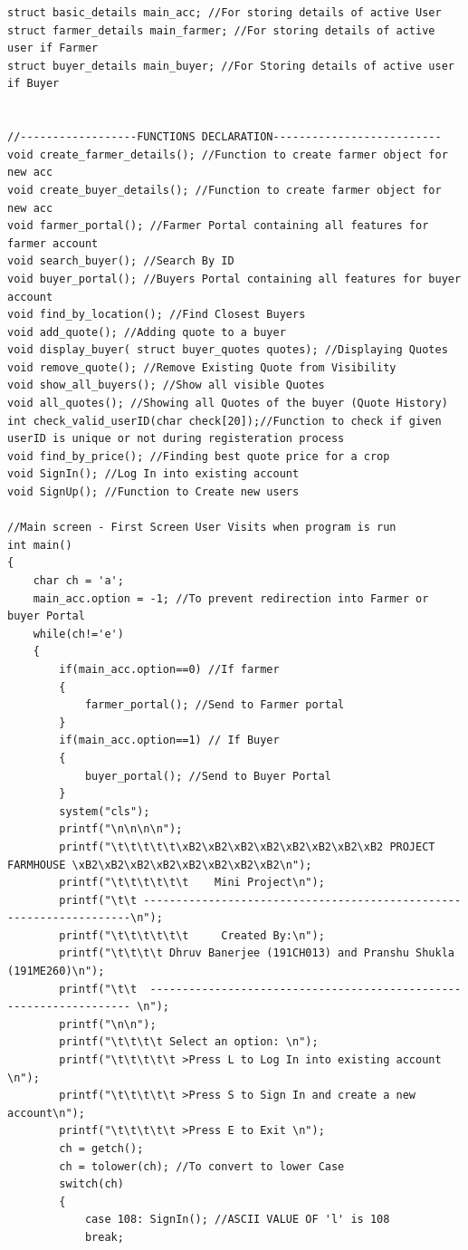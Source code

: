 \documentclass[12pt]{article}
\begin{document}
\begin{lstlisting}
struct basic_details main_acc; //For storing details of active User
struct farmer_details main_farmer; //For storing details of active user if Farmer
struct buyer_details main_buyer; //For Storing details of active user if Buyer


//------------------FUNCTIONS DECLARATION--------------------------
void create_farmer_details(); //Function to create farmer object for new acc
void create_buyer_details(); //Function to create farmer object for new acc
void farmer_portal(); //Farmer Portal containing all features for farmer account
void search_buyer(); //Search By ID
void buyer_portal(); //Buyers Portal containing all features for buyer account
void find_by_location(); //Find Closest Buyers
void add_quote(); //Adding quote to a buyer
void display_buyer( struct buyer_quotes quotes); //Displaying Quotes
void remove_quote(); //Remove Existing Quote from Visibility
void show_all_buyers(); //Show all visible Quotes
void all_quotes(); //Showing all Quotes of the buyer (Quote History)
int check_valid_userID(char check[20]);//Function to check if given userID is unique or not during registeration process
void find_by_price(); //Finding best quote price for a crop
void SignIn(); //Log In into existing account
void SignUp(); //Function to Create new users

//Main screen - First Screen User Visits when program is run
int main()
{
    char ch = 'a';
    main_acc.option = -1; //To prevent redirection into Farmer or buyer Portal
    while(ch!='e')
    {
        if(main_acc.option==0) //If farmer
        {
            farmer_portal(); //Send to Farmer portal
        }
        if(main_acc.option==1) // If Buyer
        {
            buyer_portal(); //Send to Buyer Portal
        }
        system("cls");
        printf("\n\n\n\n");
        printf("\t\t\t\t\t\xB2\xB2\xB2\xB2\xB2\xB2\xB2\xB2 PROJECT FARMHOUSE \xB2\xB2\xB2\xB2\xB2\xB2\xB2\xB2\n");
        printf("\t\t\t\t\t\t    Mini Project\n");
        printf("\t\t --------------------------------------------------------------------\n");
        printf("\t\t\t\t\t\t     Created By:\n");
        printf("\t\t\t\t Dhruv Banerjee (191CH013) and Pranshu Shukla (191ME260)\n");
        printf("\t\t  ------------------------------------------------------------------- \n");
        printf("\n\n");
        printf("\t\t\t\t Select an option: \n");
        printf("\t\t\t\t\t >Press L to Log In into existing account \n");
        printf("\t\t\t\t\t >Press S to Sign In and create a new account\n");
        printf("\t\t\t\t\t >Press E to Exit \n");
        ch = getch();
        ch = tolower(ch); //To convert to lower Case
        switch(ch)
        {
            case 108: SignIn(); //ASCII VALUE OF 'l' is 108
            break;


\end{lstlisting}
\end{document}
